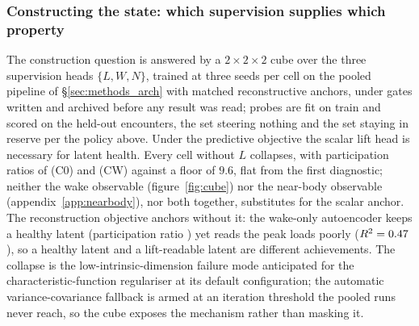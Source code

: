 
\subsubsection{Constructing the state: which supervision supplies which property}
\label{sec:res_construction}

The construction question is answered by a $2 \times 2 \times 2$ cube over
the three supervision heads $\{L, W, N\}$, trained at three seeds per cell
on the pooled pipeline of \S\ref{sec:methods_arch} with matched
reconstructive anchors, under gates written and archived before any result
was read; probes are fit on train and scored on the held-out \TestSplit{}
encounters, the \ValSplit{} set steering nothing and the \BoundarySplit{}
set staying in reserve per
the policy above. Under the predictive objective
the scalar lift head is necessary for latent health. Every cell without
$L$ collapses, with participation ratios of \TcRhoCZero{} (C0) and
\TcRhoCW{} (CW) against a floor of $9.6$, flat from the first
diagnostic; neither the wake observable (figure~\ref{fig:cube}) nor the
near-body observable (appendix~\ref{app:nearbody}), nor both together,
substitutes for the scalar anchor. The reconstruction objective anchors without it:
the wake-only autoencoder keeps a healthy latent
(participation ratio \TcRhoAeW) yet reads the peak loads poorly
($R^2 = 0.47$), so a healthy latent and a lift-readable latent
are different achievements. The collapse is the low-intrinsic-dimension
failure mode anticipated for the characteristic-function regulariser at
its default configuration; the automatic variance-covariance fallback is armed at an
iteration threshold the pooled runs never reach, so the cube exposes the
mechanism rather than masking it.\re

